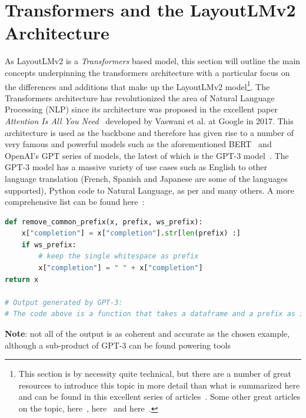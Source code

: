 \section{Transformers and the LayoutLMv2 Architecture}
As LayoutLMv2 is a \emph{Transformers} based model, this section will outline the main concepts underpinning the transformers architecture with a particular focus
on the differences and additions that make up the LayoutLMv2 model\footnote{This section is by necessity quite technical, but there are a number of great
	resources to introduce this topic in more detail than what is summarized here and can be found in this excellent
	series of articles~\autocite{doshiTransformersExplainedVisually2021}.
	Some other great articles on the topic, here~\autocite{munozAttentionAllYou2021}, here~\autocite{cristinaTransformerModel2021}
	and here~\autocite{alammarIllustratedTransformer}.}.
\bigbreak
The Transformers architecture has revolutionized the area of Natural Language Processing (NLP) since its architecture was proposed in
the excellent paper \emph{Attention Is All You Need}~\autocite{vaswaniAttentionAllYou} developed by Vaswani et al. at Google in 2017.
\bigbreak
This architecture is used as the backbone and therefore has given rise to a number of very famous and powerful models such as the
aforementioned BERT~\autocite{BERT} and OpenAI's GPT series of models, the latest of which is the GPT-3 model~\autocite{GPT3PowersNext2021}.
The GPT-3 model has a massive variety of use cases such as English to other language translation (French, Spanish and Japanese are some of the
languages supported), Python code to Natural Language, as per  and many others.
A more comprehensive list can be found here~\autocite{GPT3PowersNext2021}:
\begin{lstlisting}[language=python, label={code:GPT3_NL_translation}, caption={GPT-3 Python code for human language translation as per~\autocite{OpenAIAPI}}]
def remove_common_prefix(x, prefix, ws_prefix): 
    x["completion"] = x["completion"].str[len(prefix) :] 
    if ws_prefix: 
        # keep the single whitespace as prefix 
        x["completion"] = " " + x["completion"] 
return x 

# Output generated by GPT-3:
# The code above is a function that takes a dataframe and a prefix as input and returns a dataframe with the prefix removed from the completion column.
\end{lstlisting}
\bigbreak
\textbf{Note}: not all of the output is as coherent and accurate as the chosen example, although a sub-product of GPT-3 can be found powering tools
